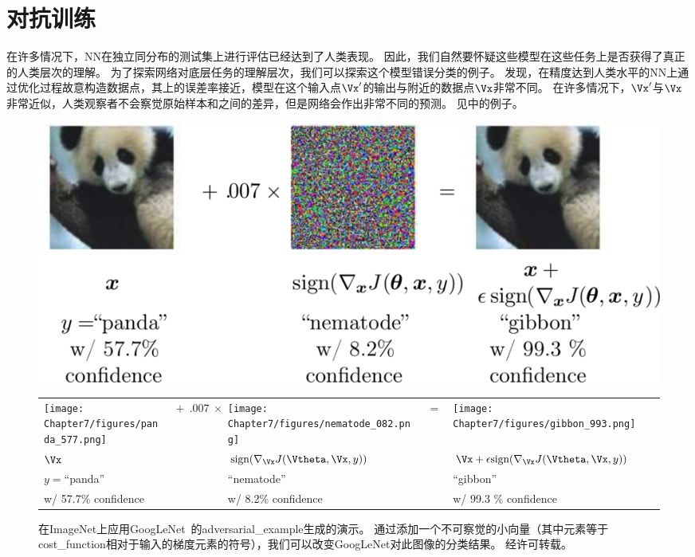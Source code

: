 \section{对抗训练}
\label{sec:adversarial_training}
在许多情况下，\gls{NN}在独立同分布的测试集上进行评估已经达到了人类表现。
因此，我们自然要怀疑这些模型在这些任务上是否获得了真正的人类层次的理解。
为了探索网络对底层任务的理解层次，我们可以探索这个模型错误分类的例子。
\cite{Szegedy-et-al-2014b}发现，在精度达到人类水平的\gls{NN}上通过优化过程故意构造数据点，其上的误差率接近，模型在这个输入点$\Vx'$的输出与附近的数据点$\Vx$非常不同。
在许多情况下，$\Vx'$与$\Vx$非常近似，人类观察者不会察觉原始样本和之间的差异，但是网络会作出非常不同的预测。
见中的例子。
\begin{figure}[!htb]
\ifOpenSource
\centerline{\includegraphics[scale=0.5]{images/61.png}}
\else
\centering
\begin{tabular}{>{\centering\arraybackslash}m{.2\figwidth}m{.5in}>{\centering\arraybackslash}m{.2\figwidth}m{.1in}>{\centering\arraybackslash}m{.2\figwidth}}
    \centering\arraybackslash
    \texttt{[image: Chapter7/figures/panda\_577.png]} &%
    \centering\arraybackslash%
$\ +\ .007\ \times$ &%
    \texttt{[image: Chapter7/figures/nematode\_082.png]} &%
    $=$ & %
    \texttt{[image: Chapter7/figures/gibbon\_993.png]} \\
    $\centering \Vx$     &%
    & $\text{sign} (\nabla_{\Vx} J(\Vtheta, \Vx, y) )$ & & $\Vx + \epsilon \text{sign} (\nabla_{\Vx} J(\Vtheta, \Vx, y) )$ \\
    $y=$``panda'' &                & ``nematode''     &   & ``gibbon'' \\
    w/ 57.7\% confidence &        &   w/ 8.2\% confidence & & w/ 99.3 \% confidence
\end{tabular}    
\fi
\caption[Fast adversarial sample generation]{
在ImageNet上应用GoogLeNet~\citep{Szegedy-et-al-2014a}的\gls{adversarial_example}生成的演示。
通过添加一个不可察觉的小向量（其中元素等于\gls{cost_function}相对于输入的梯度元素的符号），我们可以改变GoogLeNet对此图像的分类结果。
经\citet{Goodfellow-et-al-2014b}许可转载。
}
\label{fig:chap7_panda_577}
\end{figure}

